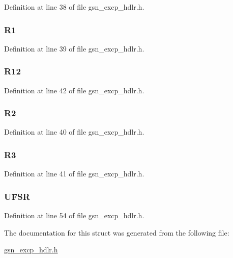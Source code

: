 Definition at line 38 of file gsn\_\-excp\_\-hdlr.h.

\hypertarget{a00070_ad35ad624c295f3c20828a68e7e4ee0c9}{
\subsubsection[{R1}]{ {\bf R1}}}
\label{a00070_ad35ad624c295f3c20828a68e7e4ee0c9}


Definition at line 39 of file gsn\_\-excp\_\-hdlr.h.

\hypertarget{a00070_ab4b83dd68da237a342f8c0437c2608a4}{
\subsubsection[{R12}]{ {\bf R12}}}
\label{a00070_ab4b83dd68da237a342f8c0437c2608a4}


Definition at line 42 of file gsn\_\-excp\_\-hdlr.h.

\hypertarget{a00070_ae2751c92a2f4b1ca5fdff5e041c977cc}{
\subsubsection[{R2}]{ {\bf R2}}}
\label{a00070_ae2751c92a2f4b1ca5fdff5e041c977cc}


Definition at line 40 of file gsn\_\-excp\_\-hdlr.h.

\hypertarget{a00070_ab88a2767b8adee3d0b36b49968dd37b9}{
\subsubsection[{R3}]{ {\bf R3}}}
\label{a00070_ab88a2767b8adee3d0b36b49968dd37b9}


Definition at line 41 of file gsn\_\-excp\_\-hdlr.h.

\hypertarget{a00070_ac28249da0687f4c0cccb204d118021e5}{
\subsubsection[{UFSR}]{ {\bf UFSR}}}
\label{a00070_ac28249da0687f4c0cccb204d118021e5}


Definition at line 54 of file gsn\_\-excp\_\-hdlr.h.



The documentation for this struct was generated from the following file:\begin{DoxyCompactItemize}
\item 
\hyperlink{a00495}{gsn\_\-excp\_\-hdlr.h}\end{DoxyCompactItemize}

